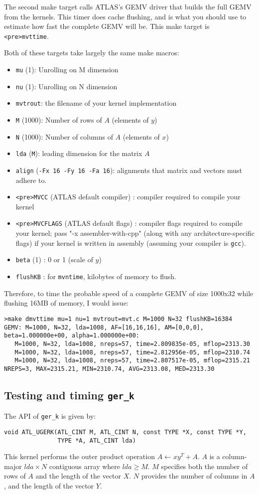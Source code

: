 \documentclass[11pt]{article}
\newcommand{\kernk}[1]{{\tt #1\_k}}
\begin{document}
The second make target calls ATLAS's GEMV driver that builds the full
GEMV from the kernels.  This timer does cache flushing, and is what you
should use to estimate how fast the complete GEMV will be.  This make target
is \verb+<pre>mvttime+.

Both of these targets take largely the same make macros:
\begin{itemize}
\item \verb+mu+ (1): Unrolling on M dimension
\item \verb+nu+ (1): Unrolling on N dimension
\item \verb+mvtrout+: the filename of your kernel implementation
\item \verb+M+ (1000): Number of rows of $A$ (elements of $y$)
\item \verb+N+ (1000): Number of columns of $A$ (elements of $x$)
\item \verb+lda+ (\verb+M+): leading dimension for the matrix $A$
\item \verb+align+ (\verb+-Fx 16 -Fy 16 -Fa 16+): alignments that
      matrix and vectors must adhere to.
\item \verb+<pre>MVCC+ (ATLAS default compiler) : compiler required
      to compile your kernel
\item \verb+<pre>MVCFLAGS+ (ATLAS default flags) : compiler flags required
      to compile your kernel; pass "-x assembler-with-cpp" (along with any
      architecture-specific flags) if your kernel is written in assembly
      (assuming your compiler is \texttt{gcc}).
\item \verb+beta+ (1) : 0 or 1 (scale of $y$)
\item \verb+flushKB+ : for {\tt mvntime}, kilobytes of memory to flush.
\end{itemize}

Therefore, to time the probable speed of a complete GEMV of size 1000x32 
while flushing 16MB of memory, I would issue:
\begin{verbatim}
>make dmvttime mu=1 nu=1 mvtrout=mvt.c M=1000 N=32 flushKB=16384
GEMV: M=1000, N=32, lda=1008, AF=[16,16,16], AM=[0,0,0], beta=1.000000e+00, alpha=1.000000e+00:
   M=1000, N=32, lda=1008, nreps=57, time=2.809835e-05, mflop=2313.30
   M=1000, N=32, lda=1008, nreps=57, time=2.812956e-05, mflop=2310.74
   M=1000, N=32, lda=1008, nreps=57, time=2.807517e-05, mflop=2315.21
NREPS=3, MAX=2315.21, MIN=2310.74, AVG=2313.08, MED=2313.30
\end{verbatim}

\subsection{Testing and timing \kernk{ger}}
The API of \kernk{ger} is given by:
\begin{verbatim}
void ATL_UGERK(ATL_CINT M, ATL_CINT N, const TYPE *X, const TYPE *Y, 
               TYPE *A, ATL_CINT lda)
\end{verbatim}
This kernel performs the outer product operation $A \leftarrow xy^T + A$.
$A$ is a column-major $lda \times N$ contiguous array where $lda \ge M$.
$M$ specifies both the number of rows of $A$ and the length of the vector $X$.
$N$ provides the number of columns in $A$, and the length of the vector $Y$.
\end{document}
